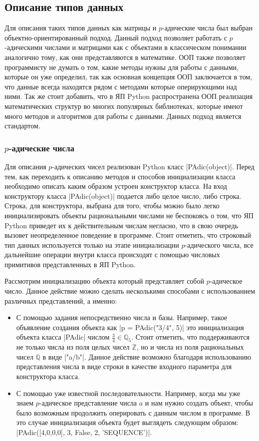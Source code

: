 \documentclass[master, och, diploma, times]{sty/SCWorks}
\theoremstyle{plain}
\theoremstyle{definition}
\numberwithin{equation}{section}
\begin{document}
\subsection{Описание типов данных}

Для описания таких типов данных как матрицы и $p$-адические числа был выбран объектно-ориентированный подход. Данный подход позволяет работать с $p$-адическими числами и матрицами как с объектами в классическом понимании аналогично тому, как они представляются в математике. ООП также позволяет программисту не думать о том, какие методы нужны для работы с данными, которые он уже определил, так как основная концепция ООП заключается в том, что данные всегда находятся рядом с методами которые оперирующими над ними. Так же стоит добавить, что в ЯП Python распространена ООП реализация математических структур во многих популярных библиотеках, которые имеют много методов и алгоритмов для работы с данными. Данных подход является стандартом.

\subsubsection{$p$-адические числа}

Для описания $p$-адических чисел реализован Python класс |PAdic(object)|. Перед тем, как переходить к описанию методов и способов инициализации класса необходимо описать каким образом устроен конструктор класса. На вход конструктору класса |PAdic(object)| подается либо целое число, либо строка. Строка, для конструктора, выбрана для того, чтобы можно было легко инициализировать объекты рациональными числами не беспокоясь о том, что ЯП Python приведет их к действительным числам негласно, что в свою очередь вызовет неопределенное поведение в программе. Стоит отметить, что строковый тип данных используется только на этапе инициализации $p$-адического числа, все дальнейшие операции внутри класса происходят с помощью числовых примитивов представленных в ЯП Python.

Рассмотрим инициализацию объекта который представляет собой $p$-адическое число. Данное действие можно сделать несколькими способами с использованием различных представлений, а именно:

 \begin{itemize}
 \item С помощью задания непосредственно числа и базы. Например, такое объявление создания объекта как |p = PAdic("3/4", 5)| это инициализация объекта класса |PAdic| числом \mbox{$\frac{3}{4} \in \mathbb{Q}_5$}. Стоит отметить, что поддерживаются не \mbox{только} числа из поля целых чисел $\mathbb{Z}$, но и числа из поля рациональных чисел $\mathbb{Q}$ в виде |"a/b"|. Данное действие возможно благодаря использованию представления числа в виде строки в качестве входного параметра для конструктора класса.
 \item С помощью уже известной последовательности. Например, когда мы уже знаем $p$-адическое представление числа $a$ и нам нужно создать объект, чтобы было возможным продолжить оперировать с данным числом в программе. В это случае инициализация объекта будет выглядеть следующим образом: |PAdic({[4,0,0,0], 3, False}, 2, 'SEQUENCE')|.
 \end{itemize}
\end{document}
